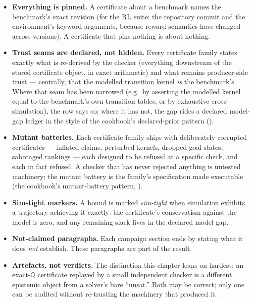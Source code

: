 \begin{itemize}
\item \textbf{Everything is pinned.} A certificate about a benchmark
  names the benchmark's exact revision (for the RL suite: the
  repository commit and the environment's keyword arguments, because
  reward semantics have changed across versions). A certificate that
  pins nothing is about nothing.
\item \textbf{Trust seams are declared, not hidden.} Every certificate
  family states exactly what is re-derived by the checker (everything
  downstream of the stored certificate object, in exact arithmetic)
  and what
  remains producer-side trust --- centrally, that the modelled
  transition kernel \emph{is} the benchmark's. Where that seam has been
  narrowed (e.g.\ by asserting the modelled kernel equal to the
  benchmark's own transition tables, or by exhaustive cross-simulation),
  the row says so; where it has not, the gap rides a declared
  model-gap ledger in the style of the cookbook's declared-prior
  pattern ().
\item \textbf{Mutant batteries.} Each certificate family ships with
  deliberately corrupted certificates --- inflated claims, perturbed
  kernels, dropped goal states, sabotaged rankings --- each designed to
  be refused at a specific check, and each in fact refused. A checker
  that has never rejected anything is untested machinery; the mutant
  battery is the family's specification made executable (the cookbook's
  mutant-battery pattern, ).
\item \textbf{Sim-tight markers.} A bound is marked \emph{sim-tight}
  when simulation exhibits a trajectory achieving it exactly: the
  certificate's conservatism against the model is zero, and any
  remaining slack lives in the declared model gap.
\item \textbf{Not-claimed paragraphs.} Each campaign section ends by
  stating what it does \emph{not} establish. These paragraphs are part
  of the result.
\item \textbf{Artefacts, not verdicts.} The distinction this chapter
  leans on hardest: an exact-$\mathbb{Q}$ certificate replayed by a
  small independent checker is a different epistemic object from a
  solver's bare ``unsat.'' Both may be correct; only one can be
  audited without re-trusting the machinery that produced it.
\end{itemize}
